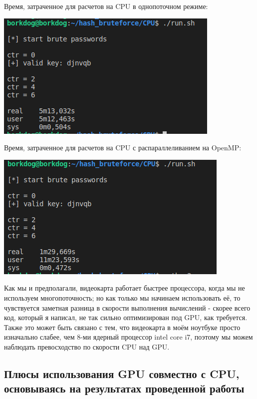 \documentclass[12pt,a4paper]{scrartcl}
\begin{document}
Время, затраченное для расчетов на CPU в однопоточном режиме:

\begin{center}
	\includegraphics[scale=0.6]{./pictures/CPU_without_openMP.png}
\end{center}

Время, затраченное для расчетов на CPU с распараллеливанием на OpenMP:

\begin{center}
	\includegraphics[scale=0.6]{./pictures/CPU.png}
\end{center}

Как мы и предполагали, видеокарта работает быстрее процессора, когда мы не используем многопоточность; но как только мы начинаем использовать её, то чувствуется заметная разница в скорости выполнения вычислений - скорее всего код, который я написал, не так сильно оптимизирован под GPU, как требуется. Также это может быть связано с тем, что видеокарта в моём ноутбуке просто изначально слабее, чем 8-ми ядерный процессор intel core i7, поэтому мы можем наблюдать превосходство по скорости  CPU над GPU.

\subsection{Плюсы использования GPU совместно с CPU, основываясь на результатах проведенной работы}
\end{document}
